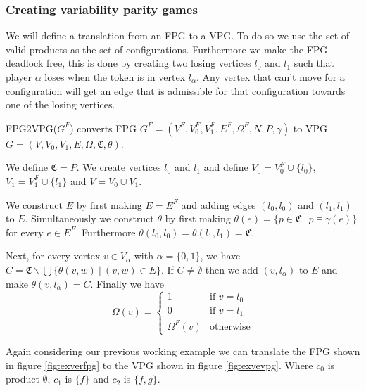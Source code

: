 \subsubsection{Creating variability parity games}
We will define a translation from an FPG to a VPG. To do so we use the set of valid products as the set of configurations. Furthermore we make the FPG deadlock free, this is done by creating two losing vertices $l_0$ and $l_1$ such that player $\alpha$ loses when the token is in vertex $l_\alpha$. Any vertex that can't move for a configuration will get an edge that is admissible for that configuration towards one of the losing vertices.
\begin{definition}
	\label{def_FPG2VPG}
	FPG2VPG($G^F$) converts FPG $G^F = (V^F, V_0^F, V_1^F, E^F, \Omega^F, N, P, \gamma)$ to VPG $G = (V, V_0, V_1, E, \Omega, \mathfrak{C}, \theta)$.
	
	We define $\mathfrak{C} = P$. We create vertices $l_0$ and $l_1$ and define $V_0 = V_0^F \cup \{l_0\}$, $V_1 = V_1^F \cup \{l_1\}$ and $V = V_0 \cup V_1$.
	
	We construct $E$ by first making $E = E^F$ and adding edges $(l_0, l_0)$ and $(l_1, l_1)$ to $E$. Simultaneously we construct $\theta$ by first making $\theta(e) = \{p \in \mathfrak{C}\ |\ p \models \gamma(e)\}$ for every $e \in E^F$. Furthermore $\theta(l_0,l_0) = \theta(l_1,l_1) = \mathfrak{C}$.
	
	Next, for every vertex $v \in V_\alpha$ with $\alpha = \{0,1\}$, we have $C = \mathfrak{C} \backslash \bigcup \{\theta(v,w)\ |\ (v,w) \in E\}$. If $C \neq \emptyset$ then we add $(v, l_\alpha)$ to $E$ and make $\theta(v,l_\alpha) = C$.
	Finally we have 
	\[ \Omega(v) = \begin{cases}
	1  & \text{if } v = l_0 \\
	0 & \text{if } v = l_1 \\
	\Omega^F(v) &\text{otherwise}
	\end{cases} \]
\end{definition}
Again considering our previous working example we can translate the FPG shown in figure \ref{fig:exverfpg} to the VPG shown in figure \ref{fig:exvevpg}. Where $c_0$ is product $\emptyset$, $c_1$ is $\{f\}$ and $c_2$ is $\{f,g\}$.
